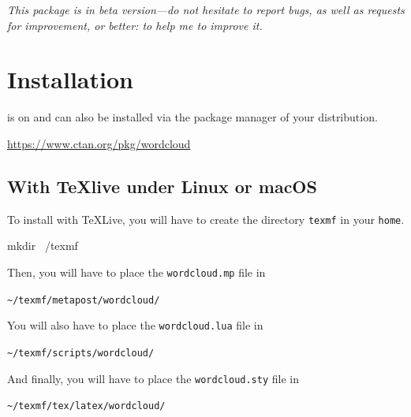 \documentclass[english]{ltxdoc}
\begin{document}
\tableofcontents

\bigskip

\begin{tcolorbox}[ arc=0pt,outer arc=0pt,
  colback=darkred!3,
  colframe=darkred,
  breakable,
  boxsep=0pt,left=5pt,right=5pt,top=5pt,bottom=5pt, bottomtitle =
  3pt, toptitle=3pt,
  boxrule=0pt,bottomrule=0.5pt,toprule=0.5pt, toprule at break =
  0pt, bottomrule at break = 0pt,]
  \itshape
  This package is in beta version---do not hesitate to report bugs, as well as
  requests for improvement, or better: to help me to improve it. 
\end{tcolorbox}

\section{Installation}

\wordcloudpkg is on \ctan{} and can also be installed via the package manager of your
distribution.

\begin{center}
  \url{https://www.ctan.org/pkg/wordcloud}
\end{center}


\subsection{With \TeX live under Linux or macOS}

To install \wordcloudpkg with \TeX Live, you will have to create the directory
\lstinline+texmf+  in your \lstinline+home+. 

\begin{commandshell}
mkdir ~/texmf
\end{commandshell}

Then, you will have to place the \lstinline+wordcloud.mp+ file in 
\begin{center}
  \verb+~/texmf/metapost/wordcloud/+
\end{center}


You will also have to place the \lstinline+wordcloud.lua+ file in 
\begin{center}
  \verb+~/texmf/scripts/wordcloud/+
\end{center}

And finally, you will have to place the \lstinline+wordcloud.sty+ file in 
\begin{center}
  \verb+~/texmf/tex/latex/wordcloud/+
\end{center}
\end{document}
